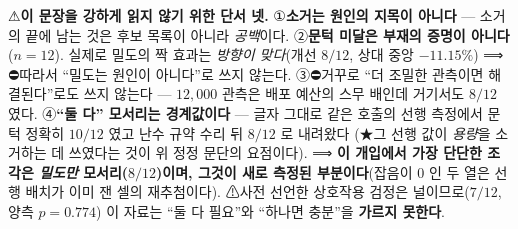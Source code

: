 \documentclass[11pt]{report}
\numberwithin{equation}{chapter}
\numberwithin{figure}{chapter}
\numberwithin{table}{chapter}
\begin{document}
⚠\textbf{이 문장을 강하게 읽지 않기 위한 단서 넷.} ①\textbf{소거는 원인의 지목이 아니다}
--- 소거의 끝에 남는 것은 후보 목록이 아니라 \emph{공백}이다. ②\textbf{문턱 미달은 부재의
증명이 아니다}($n = 12$). 실제로 밀도의 짝 효과는 \emph{방향이 맞다}(개선 $8/12$, 상대 중앙
$-11.15\%$) ⟹ ⛔따라서 ``밀도는 원인이 아니다''로 쓰지 않는다. ③⛔거꾸로 ``더 조밀한
관측이면 해결된다''로도 쓰지 않는다 --- $12{,}000$ 관측은 배포 예산의 스무 배인데 거기서도
$8/12$ 였다. ④\textbf{``둘 다'' 모서리는 경계값이다} --- 글자 그대로 같은 호출의 선행
측정에서 문턱 정확히 $10/12$ 였고 난수 규약 수리 뒤 $8/12$ 로 내려왔다
(★그 선행 값이 \emph{용량}을 소거하는 데 쓰였다는 것이 위 정정 문단의 요점이다).
⟹ \textbf{이 개입에서 가장 단단한 조각은 \emph{밀도만} 모서리($8/12$)이며, 그것이 새로
측정된 부분이다}(잡음이 $0$ 인 두 열은 선행 배치가 이미 잰 셀의 재추첨이다).
⚠사전 선언한 상호작용 검정은 널이므로($7/12$, 양측 $p = 0.774$) 이 자료는 ``둘 다 필요''와
``하나면 충분''을 \textbf{가르지 못한다}.
\end{document}
